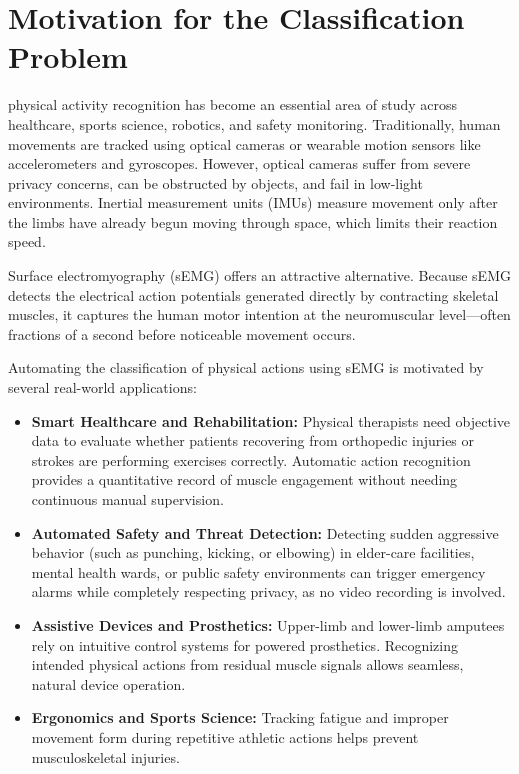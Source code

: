 \documentclass[journal]{IEEEtran}
\begin{document}
\section{Motivation for the Classification Problem}
 physical activity recognition has become an essential area of study across healthcare, sports science, robotics, and safety monitoring. Traditionally, human movements are tracked using optical cameras or wearable motion sensors like accelerometers and gyroscopes. However, optical cameras suffer from severe privacy concerns, can be obstructed by objects, and fail in low-light environments. Inertial measurement units (IMUs) measure movement only after the limbs have already begun moving through space, which limits their reaction speed.

Surface electromyography (sEMG) offers an attractive alternative. Because sEMG detects the electrical action potentials generated directly by contracting skeletal muscles, it captures the human motor intention at the neuromuscular level---often fractions of a second before noticeable movement occurs.

Automating the classification of physical actions using sEMG is motivated by several real-world applications:
\begin{itemize}
    \item \textbf{Smart Healthcare and Rehabilitation:} Physical therapists need objective data to evaluate whether patients recovering from orthopedic injuries or strokes are performing exercises correctly. Automatic action recognition provides a quantitative record of muscle engagement without needing continuous manual supervision.
    \item \textbf{Automated Safety and Threat Detection:} Detecting sudden aggressive behavior (such as punching, kicking, or elbowing) in elder-care facilities, mental health wards, or public safety environments can trigger emergency alarms while completely respecting privacy, as no video recording is involved.
    \item \textbf{Assistive Devices and Prosthetics:} Upper-limb and lower-limb amputees rely on intuitive control systems for powered prosthetics. Recognizing intended physical actions from residual muscle signals allows seamless, natural device operation.
    \item \textbf{Ergonomics and Sports Science:} Tracking fatigue and improper movement form during repetitive athletic actions helps prevent musculoskeletal injuries.
\end{itemize}
\end{document}
